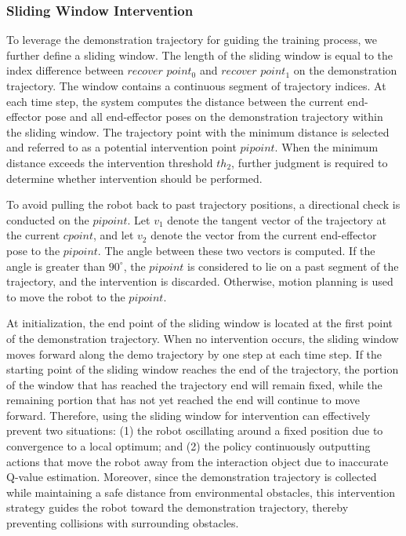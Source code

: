 \documentclass[runningheads]{llncs}
\begin{document}
\subsubsection{Sliding Window Intervention}\label{sec:sliding}

To leverage the demonstration trajectory for guiding the training process, we further define a sliding window. The length of the sliding window is equal to the index difference between $recover$ $point_0$ and $recover$ $point_1$ on the demonstration trajectory. The window contains a continuous segment of trajectory indices.
At each time step, the system computes the distance between the current end-effector pose and all end-effector poses on the demonstration trajectory within the sliding window. The trajectory point with the minimum distance is selected and referred to as a potential intervention point $pipoint$. When the minimum distance exceeds the intervention threshold $th_2$, further judgment is required to determine whether intervention should be performed.

To avoid pulling the robot back to past trajectory positions, a directional check is conducted on the $pipoint$. Let $v_1$ denote the tangent vector of the trajectory at the current $cpoint$, and let $v_2$ denote the vector from the current end-effector pose to the $pipoint$. The angle between these two vectors is computed. If the angle is greater than $90^\circ$, the $pipoint$ is considered to lie on a past segment of the trajectory, and the intervention is discarded. Otherwise, motion planning is used to move the robot to the $pipoint$.

At initialization, the end point of the sliding window is located at the first point of the demonstration trajectory. When no intervention occurs, the sliding window moves forward along the demo trajectory by one step at each time step. If the starting point of the sliding window reaches the end of the trajectory, the portion of the window that has reached the trajectory end will remain fixed, while the remaining portion that has not yet reached the end will continue to move forward. Therefore, using the sliding window for intervention can effectively prevent two situations: (1) the robot oscillating around a fixed position due to convergence to a local optimum; and (2) the policy continuously outputting actions that move the robot away from the interaction object due to inaccurate Q-value estimation. Moreover, since the demonstration trajectory is collected while maintaining a safe distance from environmental obstacles, this intervention strategy guides the robot toward the demonstration trajectory, thereby preventing collisions with surrounding obstacles.
\end{document}
